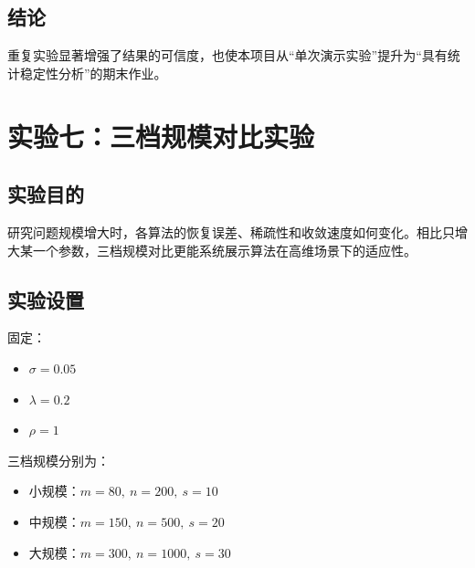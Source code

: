 \documentclass[12pt,a4paper]{ctexart}
\begin{document}
\subsection{结论}
重复实验显著增强了结果的可信度，也使本项目从“单次演示实验”提升为“具有统计稳定性分析”的期末作业。

\section{实验七：三档规模对比实验}
\subsection{实验目的}
研究问题规模增大时，各算法的恢复误差、稀疏性和收敛速度如何变化。相比只增大某一个参数，三档规模对比更能系统展示算法在高维场景下的适应性。

\subsection{实验设置}
固定：
\begin{itemize}[leftmargin=2em]
    \item $\sigma=0.05$
    \item $\lambda=0.2$
    \item $\rho=1$
\end{itemize}

三档规模分别为：
\begin{itemize}[leftmargin=2em]
    \item 小规模：$m=80,\ n=200,\ s=10$
    \item 中规模：$m=150,\ n=500,\ s=20$
    \item 大规模：$m=300,\ n=1000,\ s=30$
\end{itemize}
\end{document}
